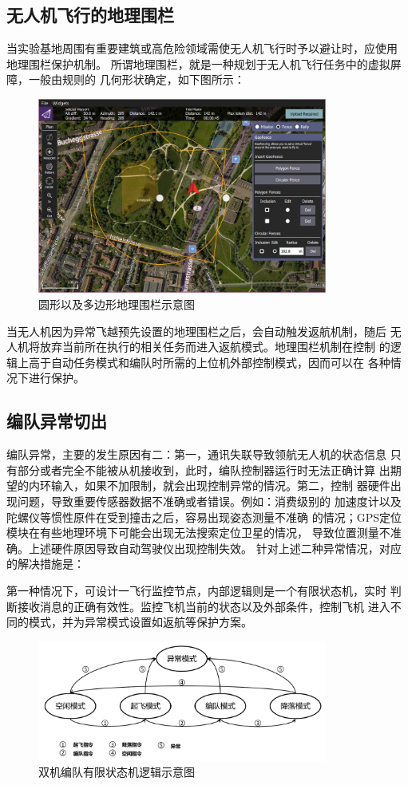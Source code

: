 \subsection{无人机飞行的地理围栏}
当实验基地周围有重要建筑或高危险领域需使无人机飞行时予以避让时，应使用
地理围栏保护机制。
所谓地理围栏，就是一种规划于无人机飞行任务中的虚拟屏障，一般由规则的
几何形状确定，如下图所示：
\begin{figure}[H]
    \centering
    \includegraphics[width=0.85\textwidth]{figures/adds/geofence_overview}
    \caption{圆形以及多边形地理围栏示意图}\label{fig:c5-geofence_overview}
\end{figure}
当无人机因为异常飞越预先设置的地理围栏之后，会自动触发返航机制，随后
无人机将放弃当前所在执行的相关任务而进入返航模式。地理围栏机制在控制
的逻辑上高于自动任务模式和编队时所需的上位机外部控制模式，因而可以在
各种情况下进行保护。
\subsection{编队异常切出}
编队异常，主要的发生原因有二：第一，通讯失联导致领航无人机的状态信息
只有部分或者完全不能被从机接收到，此时，编队控制器运行时无法正确计算
出期望的内环输入，如果不加限制，就会出现控制异常的情况。第二，控制
器硬件出现问题，导致重要传感器数据不准确或者错误。例如：消费级别的
加速度计以及陀螺仪等惯性原件在受到撞击之后，容易出现姿态测量不准确
的情况；GPS定位模块在有些地理环境下可能会出现无法搜索定位卫星的情况，
导致位置测量不准确。上述硬件原因导致自动驾驶仪出现控制失效。
针对上述二种异常情况，对应的解决措施是：

第一种情况下，可设计一飞行监控节点，内部逻辑则是一个有限状态机，实时
判断接收消息的正确有效性。监控飞机当前的状态以及外部条件，控制飞机
进入不同的模式，并为异常模式设置如返航等保护方案。
\begin{figure}[H]
    \centering
    \includegraphics[width=0.85\textwidth]{figures/adds/states_mech}
    \caption{双机编队有限状态机逻辑示意图}\label{fig:c5-states_mech}
\end{figure}

